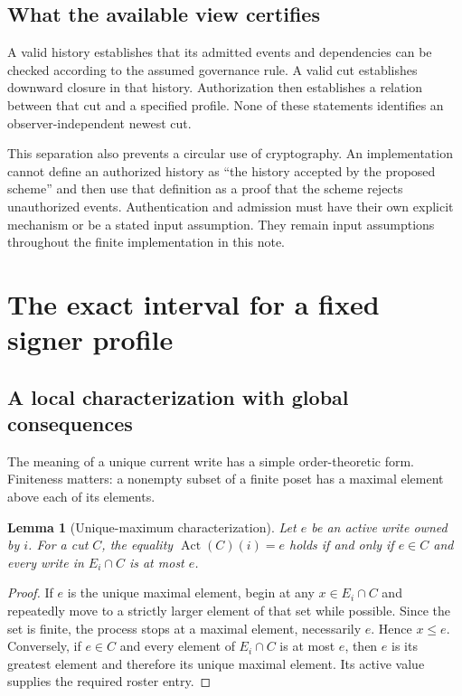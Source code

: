 \documentclass[11pt]{article}
\newtheorem{lemma}[theorem]{Lemma}
\theoremstyle{definition}
\newcommand{\Act}{\operatorname{Act}}
\begin{document}
\subsection{What the available view certifies}
A valid history establishes that its admitted events and dependencies can be checked according to the assumed governance rule. A valid cut establishes downward closure in that history. Authorization then establishes a relation between that cut and a specified profile. None of these statements identifies an observer-independent newest cut.

This separation also prevents a circular use of cryptography. An implementation cannot define an authorized history as ``the history accepted by the proposed scheme'' and then use that definition as a proof that the scheme rejects unauthorized events. Authentication and admission must have their own explicit mechanism or be a stated input assumption. They remain input assumptions throughout the finite implementation in this note.

\section{The exact interval for a fixed signer profile}\label{sec:windows}
\subsection{A local characterization with global consequences}
The meaning of a unique current write has a simple order-theoretic form. Finiteness matters: a nonempty subset of a finite poset has a maximal element above each of its elements.

\begin{lemma}[Unique-maximum characterization]\label{lem:maximum}
Let $e$ be an active write owned by $i$. For a cut $C$, the equality $\Act(C)(i)=e$ holds if and only if $e\in C$ and every write in $E_i\cap C$ is at most $e$.
\end{lemma}
\begin{proof}
If $e$ is the unique maximal element, begin at any $x\in E_i\cap C$ and repeatedly move to a strictly larger element of that set while possible. Since the set is finite, the process stops at a maximal element, necessarily $e$. Hence $x\leq e$. Conversely, if $e\in C$ and every element of $E_i\cap C$ is at most $e$, then $e$ is its greatest element and therefore its unique maximal element. Its active value supplies the required roster entry.
\end{proof}
\end{document}
